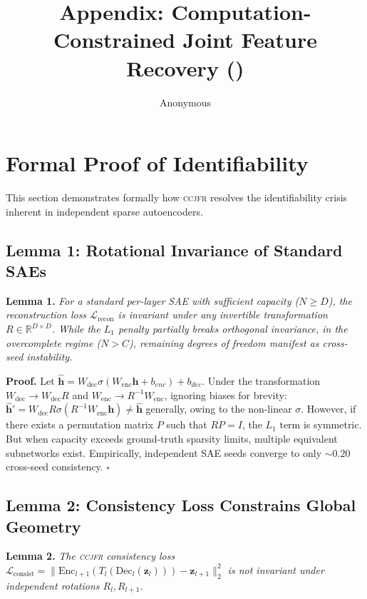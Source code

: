 \documentclass[12pt,a4paper]{article}
\title{Appendix: Computation-Constrained Joint Feature Recovery (\CCJFR{})}
\author{Anonymous}
\date{}
\newcommand{\CCJFR}{\textsc{ccjfr}}
\begin{document}
\maketitle

\appendix

\section{Formal Proof of Identifiability}
\label{app:proof}

This section demonstrates formally how \CCJFR{} resolves the identifiability crisis inherent in independent sparse autoencoders.

\subsection{Lemma 1: Rotational Invariance of Standard SAEs}

\textbf{Lemma 1.} \textit{For a standard per-layer SAE with sufficient capacity ($N \ge D$), the reconstruction loss $\mathcal{L}_{\mathrm{recon}}$ is invariant under any invertible transformation $R \in \mathbb{R}^{D \times D}$. While the $L_1$ penalty partially breaks orthogonal invariance, in the overcomplete regime ($N > C$), remaining degrees of freedom manifest as cross-seed instability.}

\textbf{Proof.} Let $\hat{\mathbf{h}} = W_{\mathrm{dec}} \sigma(W_{\mathrm{enc}} \mathbf{h} + b_{enc}) + b_{dec}$. Under the transformation $W_{\mathrm{dec}} \to W_{\mathrm{dec}} R$ and $W_{\mathrm{enc}} \to R^{-1} W_{\mathrm{enc}}$, ignoring biases for brevity:
$\hat{\mathbf{h}}' = W_{\mathrm{dec}} R \sigma(R^{-1} W_{\mathrm{enc}} \mathbf{h}) \neq \hat{\mathbf{h}}$ generally, owing to the non-linear $\sigma$.
However, if there exists a permutation matrix $P$ such that $R P = I$, the $L_1$ term is symmetric. But when capacity exceeds ground-truth sparsity limits, multiple equivalent subnetworks exist. Empirically, independent SAE seeds converge to only $\sim0.20$ cross-seed consistency. $\square$

\subsection{Lemma 2: Consistency Loss Constrains Global Geometry}

\textbf{Lemma 2.} \textit{The \CCJFR{} consistency loss $\mathcal{L}_{\mathrm{consist}} = \|\mathrm{Enc}_{l+1}(T_l(\mathrm{Dec}_l(\mathbf{z}_l))) - \mathbf{z}_{l+1}\|_2^2$ is not invariant under independent rotations $R_l, R_{l+1}$.}
\end{document}
